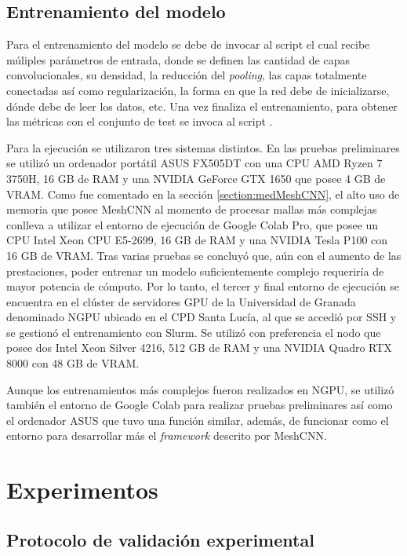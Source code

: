 \subsection{Entrenamiento del modelo}

Para el entrenamiento del modelo se debe de invocar al script  el cual recibe múliples parámetros de entrada, donde se definen las cantidad de capas convolucionales, su densidad, la reducción del \textit{pooling}, las capas totalmente conectadas así como regularización, la forma en que la red debe de inicializarse, dónde debe de leer los datos, etc. Una vez finaliza el entrenamiento, para obtener las métricas con el conjunto de test se invoca al script .

Para la ejecución se utilizaron tres sistemas distintos. En las pruebas preliminares se utilizó un ordenador portátil ASUS FX505DT con una CPU AMD Ryzen 7 3750H, 16 GB de RAM y una NVIDIA GeForce GTX 1650 que posee 4 GB de VRAM. Como fue comentado en la sección \ref{section:medMeshCNN}, el alto uso de memoria que posee MeshCNN al momento de procesar mallas más complejas conlleva a utilizar el entorno de ejecución de Google Colab Pro, que posee un CPU Intel Xeon CPU E5-2699, 16 GB de RAM y una NVIDIA Tesla P100 con 16 GB de VRAM. Tras varias pruebas se concluyó que, aún con el aumento de las prestaciones, poder entrenar un modelo suficientemente complejo requeriría de mayor potencia de cómputo. Por lo tanto, el tercer y final entorno de ejecución se encuentra en el clúster de servidores GPU de la Universidad de Granada denominado NGPU ubicado en el CPD Santa Lucía, al que se accedió por SSH y se gestionó el entrenamiento con Slurm. Se utilizó con preferencia el nodo  que posee dos Intel Xeon Silver 4216, 512 GB de RAM y una NVIDIA Quadro RTX 8000 con 48 GB de VRAM.

Aunque los entrenamientos más complejos fueron realizados en NGPU, se utilizó también el entorno de Google Colab para realizar pruebas preliminares así como el ordenador ASUS que tuvo una función similar, además, de funcionar como el entorno para desarrollar más el \textit{framework} descrito por MeshCNN.

\section{Experimentos}
\subsection{Protocolo de validación experimental}

